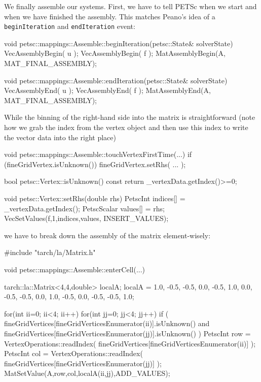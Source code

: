 We finally assemble our systems. First, we have to tell
PETSc when we start and when we have finished the assembly.
This matches Peano's idea of a \texttt{beginIteration} and
\texttt{endIteration} event:
 
\begin{code}
void petsc::mappings::Assemble::beginIteration(petsc::State&  solverState) {
  VecAssemblyBegin( u );
  VecAssemblyBegin( f );
  MatAssemblyBegin(A, MAT_FINAL_ASSEMBLY);
}

void petsc::mappings::Assemble::endIteration(petsc::State&  solverState) {
  VecAssemblyEnd( u );
  VecAssemblyEnd( f );
  MatAssemblyEnd(A, MAT_FINAL_ASSEMBLY);
}
\end{code}


\noindent
While the binning of the right-hand side into the matrix is straightforward
(note how we grab the index from the vertex object and then use this index to
write the vector data into the right place)
\begin{code}
void petsc::mappings::Assemble::touchVertexFirstTime(...) {
  if (fineGridVertex.isUnknown()) {
    fineGridVertex.setRhs(
      ...
    );
  }
}

bool petsc::Vertex::isUnknown() const {
  return _vertexData.getIndex()>=0;
}

void petsc::Vertex::setRhs(double rhs) {
  PetscInt     indices[] = {_vertexData.getIndex()};
  PetscScalar  values[]  = {rhs};
  VecSetValues(f,1,indices,values, INSERT_VALUES);
}
\end{code}

\noindent
we have to break down the assembly of the matrix element-wisely:

\begin{code}
#include "tarch/la/Matrix.h"

void petsc::mappings::Assemble::enterCell(...) {
 tarch::la::Matrix<4,4,double> localA;
 localA =  1.0,  -0.5, -0.5,  0.0,
          -0.5,   1.0,  0.0, -0.5,
          -0.5,   0.0,  1.0, -0.5,
           0.0,  -0.5, -0.5,  1.0;

 for(int ii=0; ii<4; ii++)
 for(int jj=0; jj<4; jj++) {
  if (
   fineGridVertices[fineGridVerticesEnumerator(ii)].isUnknown()
   and
   fineGridVertices[fineGridVerticesEnumerator(jj)].isUnknown()
  ) {
   PetscInt row = VertexOperations::readIndex( 
     fineGridVertices[fineGridVerticesEnumerator(ii)] );
   PetscInt col = VertexOperations::readIndex( 
     fineGridVertices[fineGridVerticesEnumerator(jj)] );
   MatSetValue(A,row,col,localA(ii,jj),ADD_VALUES);
  }
 }
}
\end{code}

